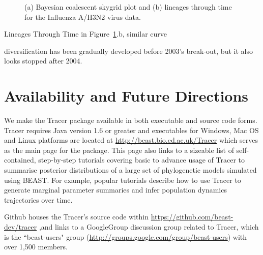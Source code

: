 \documentclass{bioinfo}
\begin{document}
\begin{figure}[ht]
\caption{(a) Bayesian coalescent skygrid plot and (b) lineages through time for the Influenza A/H3N2 virus data.}
\label{fig:flu}
\end{figure}

Lineages Through Time in Figure~\ref{fig:flu}.b, similar curve

diversification has been gradually developed before 2003's break-out, but it also looks stopped after 2004.



\section*{Availability and Future Directions}

We make the Tracer package available in both executable and source code forms.  Tracer requires Java version 1.6 or greater and executables for Windows, Mac OS and Linux platforms are located at \url{http://beast.bio.ed.ac.uk/Tracer} %
which serves as the main page for the package. This page also links to a sizeable list of self-contained, step-by-step tutorials covering basic to advance usage of Tracer to summarise posterior distributions of a large set of phylogenetic models simulated using BEAST.  For example, popular tutorials describe how to use Tracer to generate marginal parameter summaries and infer population dynamics trajectories over time.

Github houses the Tracer's source code within \url{https://github.com/beast-dev/tracer} ,and links to a GoogleGroup discussion group related to Tracer,
which is the ``beast-users" group (\url{http://groups.google.com/group/beast-users}) with over 1,500 members.
\end{document}
